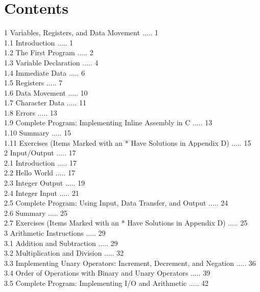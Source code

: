 \documentclass[10pt]{book}
\begin{document}
\chapter{Contents}
1 Variables, Registers, and Data Movement ..... 1\\
1.1 Introduction ..... 1\\
1.2 The First Program ..... 2\\
1.3 Variable Declaration ..... 4\\
1.4 Immediate Data ..... 6\\
1.5 Registers ..... 7\\
1.6 Data Movement ..... 10\\
1.7 Character Data ..... 11\\
1.8 Errors ..... 13\\
1.9 Complete Program: Implementing Inline Assembly in C ..... 13\\
1.10 Summary ..... 15\\
1.11 Exercises (Items Marked with an * Have Solutions in Appendix D) ..... 15\\
2 Input/Output ..... 17\\
2.1 Introduction ..... 17\\
2.2 Hello World ..... 17\\
2.3 Integer Output ..... 19\\
2.4 Integer Input ..... 21\\
2.5 Complete Program: Using Input, Data Transfer, and Output ..... 24\\
2.6 Summary ..... 25\\
2.7 Exercises (Items Marked with an * Have Solutions in Appendix D) ..... 25\\
3 Arithmetic Instructions ..... 29\\
3.1 Addition and Subtraction ..... 29\\
3.2 Multiplication and Division ..... 32\\
3.3 Implementing Unary Operators: Increment, Decrement, and Negation ..... 36\\
3.4 Order of Operations with Binary and Unary Operators ..... 39\\
3.5 Complete Program: Implementing I/O and Arithmetic ..... 42\\
\end{document}
